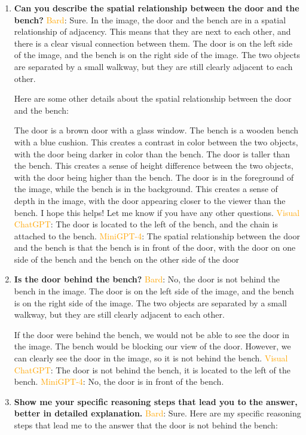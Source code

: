     \begin{enumerate}
        \item \textbf{Can you describe the spatial relationship between the door and the bench?}
        \subitem \textcolor{orange}{Bard}: Sure. In the image, the door and the bench are in a spatial relationship of adjacency. This means that they are next to each other, and there is a clear visual connection between them. The door is on the left side of the image, and the bench is on the right side of the image. The two objects are separated by a small walkway, but they are still clearly adjacent to each other.

        Here are some other details about the spatial relationship between the door and the bench:
        
        The door is a brown door with a glass window. The bench is a wooden bench with a blue cushion. This creates a contrast in color between the two objects, with the door being darker in color than the bench.
        The door is taller than the bench. This creates a sense of height difference between the two objects, with the door being higher than the bench.
        The door is in the foreground of the image, while the bench is in the background. This creates a sense of depth in the image, with the door appearing closer to the viewer than the bench.
        I hope this helps! Let me know if you have any other questions.
        \subitem \textcolor{orange}{Visual ChatGPT}: The door is located to the left of the bench, and the chain is attached to the bench.
        \subitem \textcolor{orange}{MiniGPT-4}: The spatial relationship between the door and the bench is that the bench is in front of the door, with the door on one side of the bench and the bench on the other side of the door
        \item \textbf{Is the door behind the bench?}
        \subitem \textcolor{orange}{Bard}: No, the door is not behind the bench in the image. The door is on the left side of the image, and the bench is on the right side of the image. The two objects are separated by a small walkway, but they are still clearly adjacent to each other.

        If the door were behind the bench, we would not be able to see the door in the image. The bench would be blocking our view of the door. However, we can clearly see the door in the image, so it is not behind the bench.
        \subitem \textcolor{orange}{Visual ChatGPT}: The door is not behind the bench, it is located to the left of the bench.
        \subitem \textcolor{orange}{MiniGPT-4}: No, the door is in front of the bench.
        \item \textbf{Show me your specific reasoning steps that lead you to the answer, better in detailed explanation.}
        \subitem \textcolor{orange}{Bard}: Sure. Here are my specific reasoning steps that lead me to the answer that the door is not behind the bench:


\end{enumerate}
